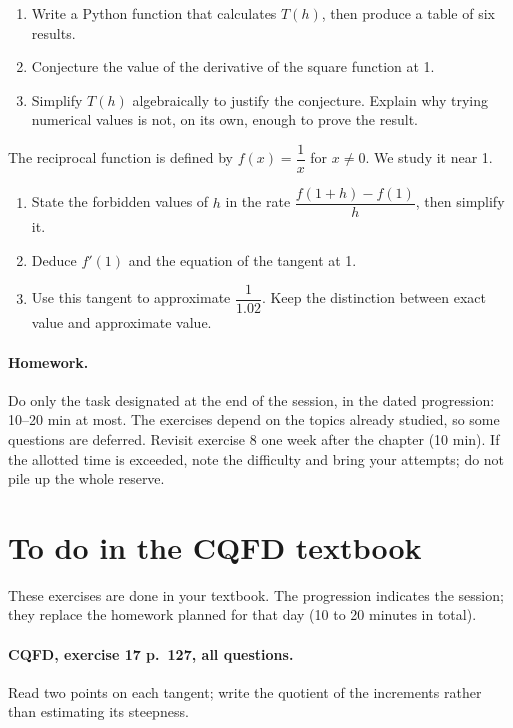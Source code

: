 \begin{enumerate}[label=\arabic*.]
\item Write a Python function that calculates $T(h)$, then produce a table of six results.
\item Conjecture the value of the derivative of the square function at 1.
\item Simplify $T(h)$ algebraically to justify the conjecture. Explain why trying numerical values is not, on its own, enough to prove the result.
\end{enumerate}
The reciprocal function is defined by $f(x)=\dfrac1x$ for $x\ne0$. We study it near 1.
\begin{enumerate}[label=\arabic*.]
\item State the forbidden values of $h$ in the rate $\dfrac{f(1+h)-f(1)}h$, then simplify it.
\item Deduce $f\prime(1)$ and the equation of the tangent at 1.
\item Use this tangent to approximate $\dfrac1{\num{1,02}}$. Keep the distinction between exact value and approximate value.
\end{enumerate}
\paragraph{Homework.} Do only the task designated at the end of the session, in the dated progression: 10--20 min at most. The exercises depend on the topics already studied, so some questions are deferred. Revisit exercise 8 one week after the chapter (10 min). If the allotted time is exceeded, note the difficulty and bring your attempts; do not pile up the whole reserve.
\endgroup
{}\section*{To do in the CQFD textbook}
These exercises are done in your textbook. The progression indicates the session; they replace the homework planned for that day (10 to 20 minutes in total).
\paragraph{CQFD, exercise 17 p.~127, all questions.}\label{C04-M1} Read two points on each tangent; write the quotient of the increments rather than estimating its steepness.
